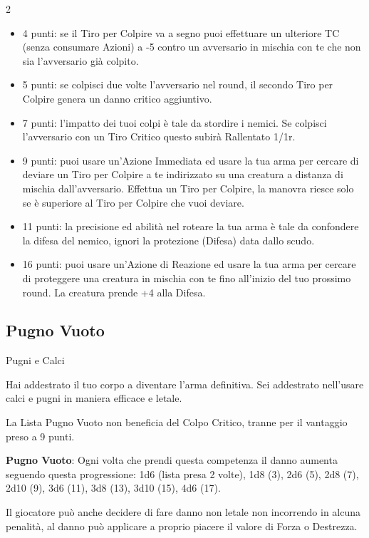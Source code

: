 \begin{multicols}{2}
\begin{itemize}[leftmargin=*] \setlength{\itemsep}{0pt}
\item 4 punti: se il Tiro per Colpire va a segno puoi effettuare un ulteriore TC (senza consumare Azioni) a -5 contro un avversario in mischia con te che non sia l'avversario già colpito.
\item 5 punti: se colpisci due volte l'avversario nel round, il secondo Tiro per Colpire genera un danno critico aggiuntivo.
\item 7 punti: l'impatto dei tuoi colpi è tale da stordire i nemici. Se colpisci l'avversario con un Tiro Critico questo subirà Rallentato 1/1r.
\item 9 punti: puoi usare un'Azione Immediata ed usare la tua arma per cercare di deviare un Tiro per Colpire a te indirizzato su una creatura a distanza di mischia dall'avversario. Effettua un Tiro per Colpire, la manovra riesce solo se è superiore al Tiro per Colpire che vuoi deviare.
\item 11 punti: la precisione ed abilità nel roteare la tua arma è tale da confondere la difesa del nemico, ignori la protezione (Difesa) data dallo scudo.
\item 16 punti: puoi usare un'Azione di Reazione ed usare la tua arma per cercare di proteggere una creatura in mischia con te fino all'inizio del tuo prossimo round. La creatura prende +4 alla Difesa.
\end{itemize}

\subsection{Pugno Vuoto} Pugni e Calci\hypertarget{pugnovuoto}{}\label{listarmipugnonudo}

Hai addestrato il tuo corpo a diventare l'arma definitiva. Sei addestrato nell'usare calci e pugni in maniera efficace e letale.

La Lista Pugno Vuoto non beneficia del Colpo Critico, tranne per il vantaggio preso a 9 punti.

\textbf{Pugno Vuoto}: Ogni volta che prendi questa competenza il danno aumenta seguendo questa progressione: 1d6 (lista presa 2 volte), 1d8 (3), 2d6 (5), 2d8 (7), 2d10 (9), 3d6 (11), 3d8 (13), 3d10 (15), 4d6 (17).

Il giocatore può anche decidere di fare danno non letale non incorrendo in alcuna penalità, al danno può applicare a proprio piacere il valore di Forza o Destrezza.


\end{multicols}
